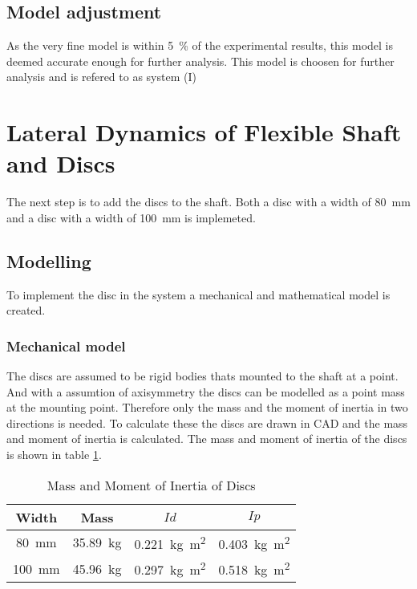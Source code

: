 \subsection{Model adjustment}
As the very fine model is within \SI{5}{\percent} of the experimental results, this model is deemed accurate enough for further analysis. This model is choosen for further analysis and is refered to as system (I)

\section{Lateral Dynamics of Flexible Shaft and Discs}
The next step is to add the discs to the shaft. Both a disc with a width of \SI{80}{\milli \meter} and a disc with a width of \SI{100}{\milli \meter} is implemeted.

\subsection{Modelling}
To implement the disc in the system a mechanical and mathematical model is created.

\subsubsection{Mechanical model}
The discs are assumed to be rigid bodies thats mounted to the shaft at a point. And with a assumtion of axisymmetry the discs can be modelled as a point mass at the mounting point. Therefore only the mass and the moment of inertia in two directions is needed. To calculate these the discs are drawn in CAD and the mass and moment of inertia is calculated. The mass and moment of inertia of the discs is shown in table \ref{tab:disc_mass_moment}.
\begin{table}[ht]
    \centering
    \caption{Mass and Moment of Inertia of Discs}
    \label{tab:disc_mass_moment}
    \begin{tabular}{@{}cccc@{}}
        \toprule
        Width    &   Mass                    &   $Id$   &   $Ip$                       \\ \midrule
        \SI{80}{\milli \meter} &  \SI{35.89}{\kilo \gram}   &   \SI{0.221}{\kilo \gram \square \meter} & \SI{0.403}{\kilo \gram \square \meter} \\ 
        \SI{100}{\milli \meter} &   \SI{45.96}{\kilo \gram}   &   \SI{0.297}{\kilo \gram \square \meter} & \SI{0.518}{\kilo \gram \square \meter}\\ \bottomrule
    \end{tabular}
\end{table}

